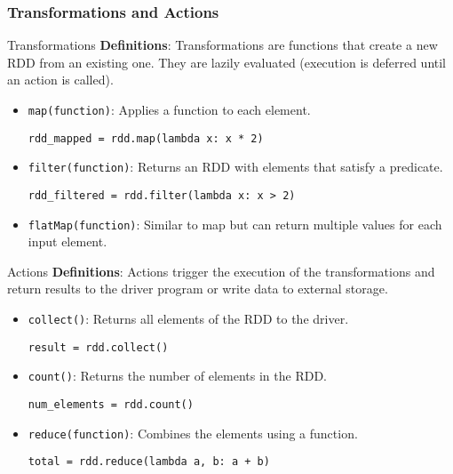 \documentclass[aspectratio=169]{beamer}
\begin{document}
\begin{frame}[fragile]
    \frametitle{Transformations and Actions}
    \begin{block}{Transformations}
        \textbf{Definitions}: Transformations are functions that create a new RDD from an existing one. They are lazily evaluated (execution is deferred until an action is called).
        \begin{itemize}
            \item \texttt{map(function)}: Applies a function to each element.
            \begin{lstlisting}
rdd_mapped = rdd.map(lambda x: x * 2)
            \end{lstlisting}
            \item \texttt{filter(function)}: Returns an RDD with elements that satisfy a predicate.
            \begin{lstlisting}
rdd_filtered = rdd.filter(lambda x: x > 2)
            \end{lstlisting}
            \item \texttt{flatMap(function)}: Similar to map but can return multiple values for each input element.
        \end{itemize}
    \end{block}

    \begin{block}{Actions}
        \textbf{Definitions}: Actions trigger the execution of the transformations and return results to the driver program or write data to external storage.
        \begin{itemize}
            \item \texttt{collect()}: Returns all elements of the RDD to the driver.
            \begin{lstlisting}
result = rdd.collect()
            \end{lstlisting}
            \item \texttt{count()}: Returns the number of elements in the RDD.
            \begin{lstlisting}
num_elements = rdd.count()
            \end{lstlisting}
            \item \texttt{reduce(function)}: Combines the elements using a function.
            \begin{lstlisting}
total = rdd.reduce(lambda a, b: a + b)
            \end{lstlisting}
        \end{itemize}
    \end{block}
\end{frame}
\end{document}
